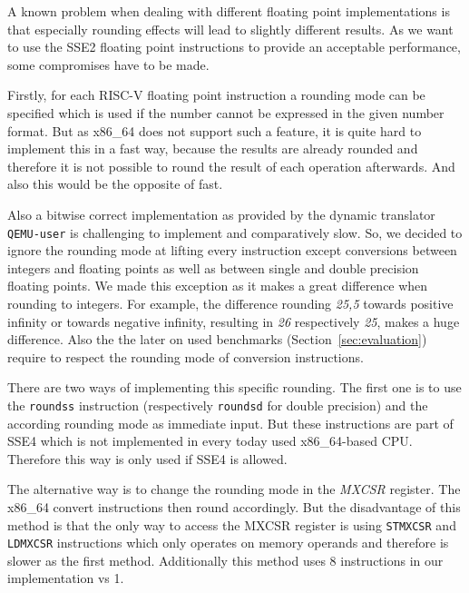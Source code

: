 \documentclass[course=eragp]{aspdoc}
\begin{document}
A known problem when dealing with different floating point implementations is that especially
rounding effects will lead to slightly different results. As we want to use the SSE2 floating point
instructions to provide an acceptable performance, some compromises have to be made.

\par

Firstly, for each RISC-V floating point instruction a rounding mode can be specified which is used
if the number cannot be expressed in the given number format. But as x86\_64 does not support such a
feature, it is quite hard to implement this in a fast way, because the results are already rounded
and therefore it is not possible to round the result of each operation afterwards. And also this
would be the opposite of fast.

\par

Also a bitwise correct implementation as provided by the dynamic translator \texttt{QEMU-user} is
challenging to implement and comparatively slow. So, we decided to ignore the rounding mode at lifting
every instruction except conversions between integers and floating points as well as between single
and double precision floating points. We made this exception as it makes a great difference when
rounding to integers. For example, the difference rounding \emph{25,5} towards positive infinity or
towards negative infinity, resulting in \emph{26} respectively \emph{25}, makes a huge difference.
Also the the later on used benchmarks (Section~\ref{sec:evaluation}) require to respect the rounding mode of
conversion instructions.

\par

There are two ways of implementing this specific rounding. The first one is to use the \texttt{roundss}
instruction (respectively \texttt{roundsd} for double precision) and the according rounding mode as
immediate input. But these instructions are part of SSE4 which is not implemented in every today used
x86\_64-based CPU.~\cite{intel2017man} Therefore this way is only used if SSE4 is allowed.

\par

The alternative way is to change the rounding mode in the \emph{MXCSR} register. The x86\_64 convert
instructions then round accordingly. But the disadvantage of this method is that the only way to
access the MXCSR register is using \texttt{STMXCSR} and \texttt{LDMXCSR} instructions which only operates on
memory operands and therefore is slower as the first method. Additionally this method uses 8
instructions in our implementation vs 1.~\cite{intel2017man}
\end{document}
